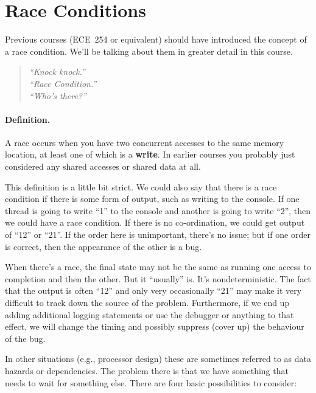 





\section*{Race Conditions}
Previous courses (ECE~254 or equivalent) should have introduced the concept of a race condition. We'll be talking about them in greater detail in this course.

\begin{quote}
\textit{
	``Knock knock.''\\
	``Race Condition.''\\
	``Who's there?''
	}
\end{quote}

\paragraph{Definition.} A race occurs when you have two concurrent accesses to the
same memory location, at least one of which is a {\bf write}. In earlier courses you probably just considered any shared accesses or shared data at all. 

This definition is a little bit strict. We could also say that there is a race condition if there is some form of output, such as writing to the console. If one thread is going to write ``1'' to the console and another is going to write ``2'', then we could have a race condition. If there is no co-ordination, we could get output of ``12'' or ``21''. If the order here is unimportant, there's no issue; but if one order is correct, then the appearance of the other is a bug.

When there's a race, the final state may not be the same as running
one access to completion and then the other. But it ``usually'' is. It's nondeterministic. The fact that the output is often ``12'' and only very occasionally ``21'' may make it very difficult to track down the source of the problem. Furthermore, if we end up adding additional logging statements or use the debugger or anything to that effect, we will change the timing and possibly suppress (cover up) the behaviour of the bug.

In other situations (e.g., processor design) these are sometimes referred to as data hazards or dependencies. The problem there is that we have something that needs to wait for something else. There are four basic possibilities to consider:

